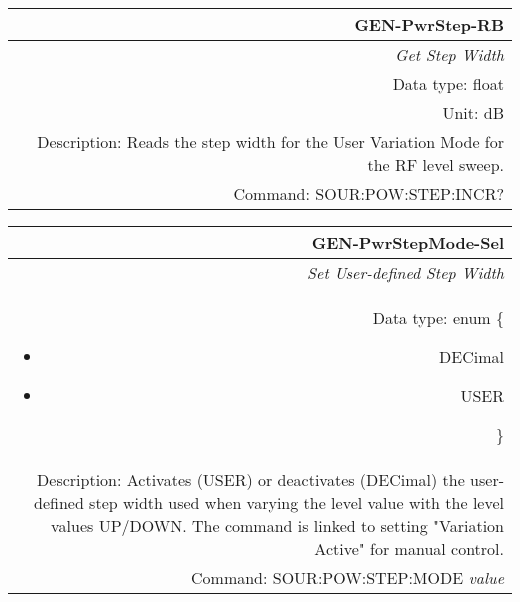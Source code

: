 \documentclass[openany]{article}
\begin{document}
		\begin{tabular}{N}
			\hline
			\bfseries GEN-PwrStep-RB \\ \hline
			\emph{Get Step Width} \\
			Data type: float \\
			Unit: dB \\
			Description: Reads the step width for the User Variation Mode for the RF level sweep. \\
			Command: SOUR:POW:STEP:INCR? \\

		\end{tabular}
%
		\begin{tabular}{N}
			\hline
			\bfseries GEN-PwrStepMode-Sel \\ \hline
			\emph{Set User-defined Step Width} \\
			Data type: enum \{\begin{itemize}[noitemsep]
				\small
				\item[] DECimal
				\item[] USER
			\end{itemize}\} \\
			Description: Activates (USER) or deactivates (DECimal) the user-defined step width used when varying the level value with the level values UP/DOWN. The command is linked to setting "Variation Active" for manual control. \\
			Command: SOUR:POW:STEP:MODE \emph{value} \\

		\end{tabular}
\end{document}
